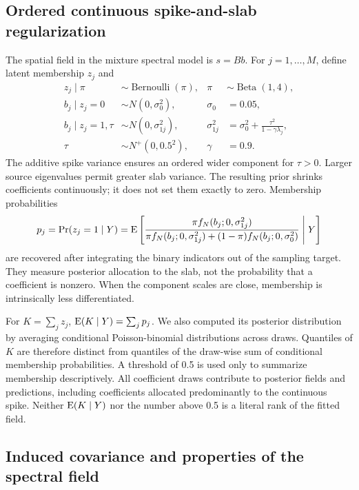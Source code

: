 \documentclass[11pt]{article}
\begin{document}
\subsection{Ordered continuous spike-and-slab regularization}
The spatial field in the mixture spectral model is $s=Bb$. For $j=1,\ldots,M$, define latent membership $z_j$ and
\begin{align}
 z_j\mid\pi&\sim\operatorname{Bernoulli}(\pi), & \pi&\sim\operatorname{Beta}(1,4),\\
 b_j\mid z_j=0&\sim N(0,\sigma_0^2), & \sigma_0&=0.05,\\
 b_j\mid z_j=1,\tau&\sim N(0,\sigma_{1j}^2), &
 \sigma_{1j}^2&=\sigma_0^2+\frac{\tau^2}{1-\gamma\lambda_j},\\
 \tau&\sim N^+(0,0.5^2), & \gamma&=0.9.
 \label{eq:mixture}
\end{align}
The additive spike variance ensures an ordered wider component for $\tau>0$. Larger source eigenvalues permit greater slab variance. The resulting prior shrinks coefficients continuously; it does not set them exactly to zero. Membership probabilities
\begin{equation}
 p_j=\Pr(z_j=1\mid Y)
 =\operatorname{E}\left[\frac{\pi f_N(b_j;0,\sigma_{1j}^2)}
 {\pi f_N(b_j;0,\sigma_{1j}^2)+(1-\pi)f_N(b_j;0,\sigma_0^2)}\;\middle|\;Y\right]
\end{equation}
are recovered after integrating the binary indicators out of the sampling target. They measure posterior allocation to the slab, not the probability that a coefficient is nonzero. When the component scales are close, membership is intrinsically less differentiated.

For $K=\sum_jz_j$, $\operatorname{E}(K\mid Y)=\sum_jp_j$. We also computed its posterior distribution by averaging conditional Poisson-binomial distributions across draws. Quantiles of $K$ are therefore distinct from quantiles of the draw-wise sum of conditional membership probabilities. A threshold of 0.5 is used only to summarize membership descriptively. All coefficient draws contribute to posterior fields and predictions, including coefficients allocated predominantly to the continuous spike. Neither $\operatorname{E}(K\mid Y)$ nor the number above 0.5 is a literal rank of the fitted field.

\subsection{Induced covariance and properties of the spectral field}
\label{sec:induced_covariance}
\end{document}
